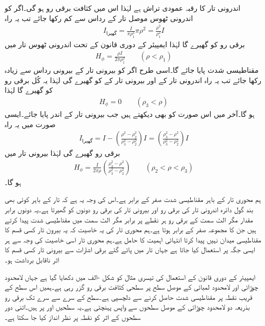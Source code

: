 اندرونی تار کا رقبہ عمودی تراش  ہے لہٰذا اس میں کثافت برقی رو  ہو گی۔اگر  کو اندرونی ٹھوس موصل تار کے رداس  سے کم رکھا جائے تب یہ راہ
\begin{align*}
I_{\text{گھیرا}}=\frac{I}{\pi \rho_1^2}\pi \rho^2=\frac{\rho^2}{\rho_1^2} I
\end{align*}
برقی رو کو گھیرے گا لہٰذا ایمپیئر کے دوری قانون کے تحت اندرونی ٹھوس تار میں
\begin{align*}
H_{\phi}=\frac{\rho I}{2\pi \rho_1^2} \quad \quad (\rho < \rho_1)
\end{align*}
مقناطیسی شدت پایا جائے گا۔اسی طرح اگر  کو بیرونی تار کے بیرونی رداس  سے زیادہ رکھا جائے تب یہ راہ اندرونی تار کے  اور بیرونی تار کے  کو گھیرے گی لہٰذا یہ  کُل  برقی رو کو گھیرے گا لہٰذا 
\begin{align*}
H_{\phi} =0 \quad \quad (\rho_3 < \rho)
\end{align*}
ہو گا۔آخر میں اس صورت کو بھی دیکھتے ہیں جب  بیرونی تار کے اندر پایا جائے۔ایسی صورت میں یہ راہ
\begin{align*}
I_{\text{گھیرا}}=I-\left(\frac{\rho^2-\rho_2^2}{\rho_3^2-\rho_2^2}\right) I=\left(\frac{\rho_3^2-\rho^2}{\rho_3^2-\rho_2^2}\right)I
\end{align*}
برقی رو گھیرے گی لہٰذا بیرونی تار میں
\begin{align*}
H_{\phi}=\frac{I}{2\pi \rho} \left(\frac{\rho_3^2-\rho^2}{\rho_3^2-\rho_2^2} \right) \quad \quad (\rho_2<\rho<\rho_3)
\end{align*}
ہو گا۔ 

ہم محوری تار کے باہر مقناطیسی شدت صفر کے برابر ہے۔اس کی وجہ یہ ہے کہ تار کے باہر کوئی بھی بند گول دائرہ اندرونی تار کی برقی رو  اور بیرونی تار کی برقی رو  دونوں کو گھیرتا ہے۔یہ دونوں برابر مقدار مگر الٹ سمت کے برقی رو ہر نقطے پر برابر مگر الٹ سمت میں مقناطیسی شدت پیدا کرتے ہیں جن کا مجموعہ صفر کے برابر ہوتا ہے۔ہم محوری تار کی یہ خاصیت کہ یہ بیرون تار کسی قسم کا مقناطیسی میدان نہیں پیدا کرتا انتہائی اہمیت کا حامل ہے۔ہم محوری تار اسی خاصیت کی وجہ سے ہر ایسی جگہ پر استعمال کیا جاتا ہے جہاں تار میں پائے گئے برقی اشارات سے بیرونی تار کسی قسم کا اثر ناقابل برداشت ہو۔

ایمپیئر کے دوری قانون کے استعمال کی تیسری مثال کو شکل -الف میں دکھایا گیا ہے جہاں  لامحدود چوڑائی اور لامحدود لمبائی کے موصل سطح پر  سطحی کثافت برقی رو گزر رہی ہے۔ہمیں اس سطح کے قریب نقطہ  پر مقناطیسی شدت حاصل کرنے سے دلچسپی ہے۔سطح کے  سرے سے  سرے تک برقی رو بذریعہ دو لامحدود چوڑائی کے موصل سطحوں سے واپس پہنچتی ہے۔یہ سطحیں  اور  پر ہیں۔اتنی دور سطحوں کے اثر کو نقطہ  پر نظر انداز کیا جا سکتا ہے۔

